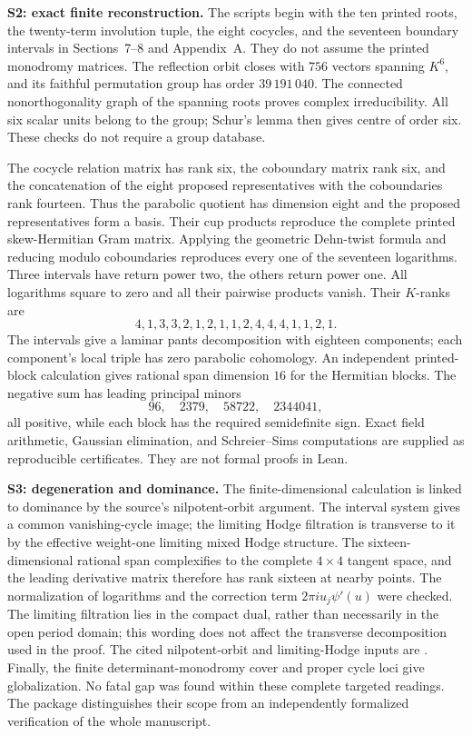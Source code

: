 \documentclass[11pt,a4paper]{article}
\theoremstyle{definition}\newtheorem{definition}[theorem]{Definition}
\theoremstyle{remark}\newtheorem{remark}[theorem]{Remark}
\begin{document}
\textbf{S2: exact finite reconstruction.}
The scripts begin with the ten printed roots, the twenty-term involution tuple, the eight cocycles, and the seventeen boundary intervals in Sections~7--8 and Appendix~A. They do not assume the printed monodromy matrices. The reflection orbit closes with $756$ vectors spanning $K^6$, and its faithful permutation group has order $39\,191\,040$. The connected nonorthogonality graph of the spanning roots proves complex irreducibility. All six scalar units belong to the group; Schur's lemma then gives centre of order six. These checks do not require a group database.

The cocycle relation matrix has rank six, the coboundary matrix rank six, and the concatenation of the eight proposed representatives with the coboundaries rank fourteen. Thus the parabolic quotient has dimension eight and the proposed representatives form a basis. Their cup products reproduce the complete printed skew-Hermitian Gram matrix. Applying the geometric Dehn-twist formula and reducing modulo coboundaries reproduces every one of the seventeen logarithms. Three intervals have return power two, the others return power one. All logarithms square to zero and all their pairwise products vanish. Their $K$-ranks are
\[
 4,1,3,3,2,1,2,1,1,2,4,4,4,1,1,2,1.
\]
The intervals give a laminar pants decomposition with eighteen components; each component's local triple has zero parabolic cohomology. An independent printed-block calculation gives rational span dimension $16$ for the Hermitian blocks. The negative sum has leading principal minors
\[
 96,\quad2379,\quad58722,\quad2344041,
\]
all positive, while each block has the required semidefinite sign. Exact field arithmetic, Gaussian elimination, and Schreier--Sims computations are supplied as reproducible certificates. They are not formal proofs in Lean.

\textbf{S3: degeneration and dominance.}
The finite-dimensional calculation is linked to dominance by the source's nilpotent-orbit argument. The interval system gives a common vanishing-cycle image; the limiting Hodge filtration is transverse to it by the effective weight-one limiting mixed Hodge structure. The sixteen-dimensional rational span complexifies to the complete $4\times4$ tangent space, and the leading derivative matrix therefore has rank sixteen at nearby points. The normalization of logarithms and the correction term $2\pi i u_j\psi'(u)$ were checked. The limiting filtration lies in the compact dual, rather than necessarily in the open period domain; this wording does not affect the transverse decomposition used in the proof. The cited nilpotent-orbit and limiting-Hodge inputs are \citet[Theorems~4.12 and 6.16, printed pp.~233 and 255]{Schmid73}. Finally, the finite determinant-monodromy cover and proper cycle loci give globalization. No fatal gap was found within these complete targeted readings. The package distinguishes their scope from an independently formalized verification of the whole manuscript.
\end{document}
